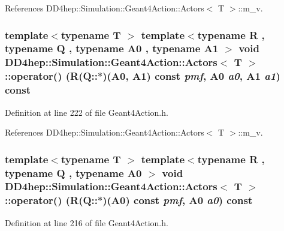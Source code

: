 References DD4hep::Simulation::Geant4Action::Actors$<$ T $>$::m\_\-v.\hypertarget{class_d_d4hep_1_1_simulation_1_1_geant4_action_1_1_actors_a1cceecd5397ed7a87468a0ccff4b4f01}{
\subsubsection[{operator()}]{\setlength{\rightskip}{0pt plus 5cm}template$<$typename T $>$ template$<$typename R , typename Q , typename A0 , typename A1 $>$ void {\bf DD4hep::Simulation::Geant4Action::Actors}$<$ {\bf T} $>$::operator() (R(Q::$\ast$)(A0, A1) const  {\em pmf}, \/  A0 {\em a0}, \/  A1 {\em a1}) const}}
\label{class_d_d4hep_1_1_simulation_1_1_geant4_action_1_1_actors_a1cceecd5397ed7a87468a0ccff4b4f01}


Definition at line 222 of file Geant4Action.h.

References DD4hep::Simulation::Geant4Action::Actors$<$ T $>$::m\_\-v.\hypertarget{class_d_d4hep_1_1_simulation_1_1_geant4_action_1_1_actors_a8726cbc282af42323025f943503cd670}{
\subsubsection[{operator()}]{\setlength{\rightskip}{0pt plus 5cm}template$<$typename T $>$ template$<$typename R , typename Q , typename A0 $>$ void {\bf DD4hep::Simulation::Geant4Action::Actors}$<$ {\bf T} $>$::operator() (R(Q::$\ast$)(A0) const  {\em pmf}, \/  A0 {\em a0}) const}}
\label{class_d_d4hep_1_1_simulation_1_1_geant4_action_1_1_actors_a8726cbc282af42323025f943503cd670}


Definition at line 216 of file Geant4Action.h.

